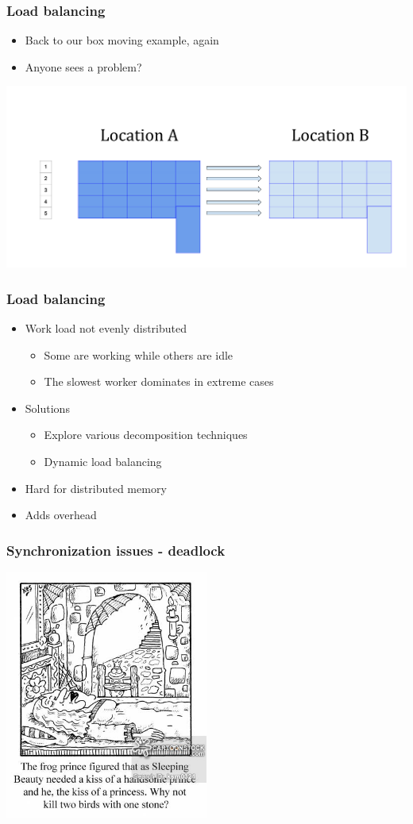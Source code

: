 \documentclass[10pt,t]{beamer}
\begin{document}
\begin{frame}
  \frametitle{Load balancing}
  \begin{itemize}
  \item Back to our box moving example, again
  \item Anyone sees a problem?
  \end{itemize}
  \includegraphics[width=\textwidth]{./Load-Balance}
\end{frame}

\begin{frame}
  \frametitle{Load balancing}
  \begin{itemize}
  \item Work load not evenly distributed
    \begin{itemize}
    \item Some are working while others are idle
    \item The slowest worker dominates in extreme cases
    \end{itemize}
  \item Solutions
    \begin{itemize}
    \item Explore various decomposition techniques
    \item Dynamic load balancing
    \end{itemize}
  \item Hard for distributed memory
  \item Adds overhead
  \end{itemize}
\end{frame}

\begin{frame}
  \frametitle{Synchronization issues - deadlock}
  \begin{center}
    \includegraphics[width=0.5\textwidth]{./SBFP}
  \end{center}
\end{frame}
\end{document}
